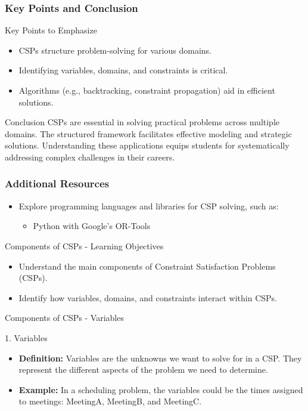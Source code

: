 \documentclass[aspectratio=169]{beamer}
\begin{document}
\begin{frame}[fragile]
    \frametitle{Key Points and Conclusion}
    \begin{block}{Key Points to Emphasize}
        \begin{itemize}
            \item CSPs structure problem-solving for various domains.
            \item Identifying variables, domains, and constraints is critical.
            \item Algorithms (e.g., backtracking, constraint propagation) aid in efficient solutions.
        \end{itemize}
    \end{block}
    \begin{block}{Conclusion}
        CSPs are essential in solving practical problems across multiple domains. The structured framework facilitates effective modeling and strategic solutions. Understanding these applications equips students for systematically addressing complex challenges in their careers.
    \end{block}
\end{frame}

\begin{frame}[fragile]
    \frametitle{Additional Resources}
    \begin{itemize}
        \item Explore programming languages and libraries for CSP solving, such as:
        \begin{itemize}
            \item Python with Google’s OR-Tools
        \end{itemize}
    \end{itemize}
\end{frame}

\begin{frame}[fragile]{Components of CSPs - Learning Objectives}
    \begin{itemize}
        \item Understand the main components of Constraint Satisfaction Problems (CSPs).
        \item Identify how variables, domains, and constraints interact within CSPs.
    \end{itemize}
\end{frame}

\begin{frame}[fragile]{Components of CSPs - Variables}
    \begin{block}{1. Variables}
        \begin{itemize}
            \item \textbf{Definition:} Variables are the unknowns we want to solve for in a CSP. They represent the different aspects of the problem we need to determine.
            \item \textbf{Example:} In a scheduling problem, the variables could be the times assigned to meetings: MeetingA, MeetingB, and MeetingC.
        \end{itemize}
    \end{block}
\end{frame}
\end{document}
